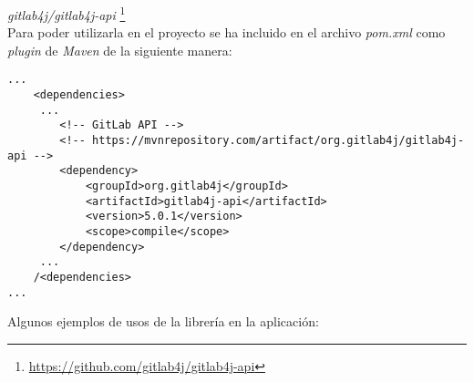\textit{gitlab4j/gitlab4j-api} \footnote{\url{https://github.com/gitlab4j/gitlab4j-api}}\\

Para poder utilizarla en el proyecto se ha incluido en el archivo \textit{pom.xml} como \textit{plugin} de \textit{Maven} de la siguiente manera:\\

\begin{minipage}{\linewidth}
{\tiny
\begin{verbatim}
...
	<dependencies>
	 ...
		<!-- GitLab API -->
		<!-- https://mvnrepository.com/artifact/org.gitlab4j/gitlab4j-api -->
		<dependency>
			<groupId>org.gitlab4j</groupId>
			<artifactId>gitlab4j-api</artifactId>
			<version>5.0.1</version>
			<scope>compile</scope>
		</dependency>
	 ...
	/<dependencies>
...
\end{verbatim}
}
\end{minipage}

\newpage

Algunos ejemplos de usos de la librería en la aplicación:\\

